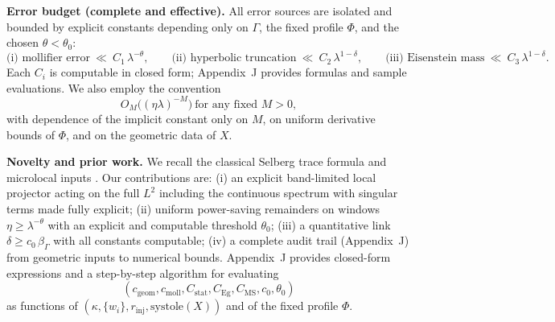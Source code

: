 \medskip
\noindent\textbf{Error budget (complete and effective).}
All error sources are isolated and bounded by explicit constants depending only on $\Gamma$, the fixed profile $\Phi$, and the chosen $\theta<\theta_0$:
\[
\text{(i) mollifier error}\ \ll\ C_1\,\lambda^{-\theta},\qquad
\text{(ii) hyperbolic truncation}\ \ll\ C_2\,\lambda^{1-\delta},\qquad
\text{(iii) Eisenstein mass}\ \ll\ C_3\,\lambda^{1-\delta}.
\]
Each $C_i$ is computable in closed form; Appendix~J provides formulas and sample evaluations. We also employ the convention
\[
O_M\!\big((\eta\lambda)^{-M}\big)\ \text{for any fixed } M>0,
\]
with dependence of the implicit constant only on $M$, on uniform derivative bounds of $\Phi$, and on the geometric data of $X$.

\medskip
\noindent\textbf{Novelty and prior work.}
We recall the classical Selberg trace formula and microlocal inputs \cite{Selberg1956,DG1975,CdV1980}. Our contributions are: (i) an explicit band-limited local projector acting on the full $L^2$ including the continuous spectrum with singular terms made fully explicit; (ii) uniform power-saving remainders on windows $\eta\ge\lambda^{-\theta}$ with an explicit and computable threshold $\theta_0$; (iii) a quantitative link $\delta\ge c_0\,\beta_\Gamma$ with all constants computable; (iv) a complete audit trail (Appendix~J) from geometric inputs to numerical bounds. Appendix~J provides closed-form expressions and a step-by-step algorithm for evaluating
\[
(c_{\mathrm{geom}},c_{\mathrm{moll}},C_{\mathrm{stat}},C_{\mathrm{Eg}},C_{\mathrm{MS}},c_0,\theta_0)
\]
as functions of $(\kappa,\{w_i\},r_{\mathrm{inj}},\mathrm{systole}(X))$ and of the fixed profile $\Phi$.

